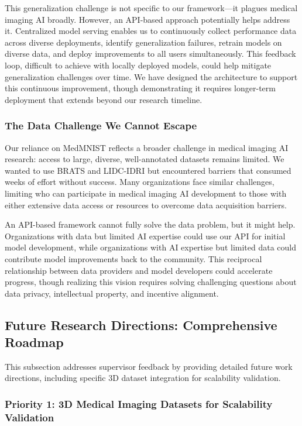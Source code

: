 \documentclass[12pt,a4paper]{article}
\begin{document}
This generalization challenge is not specific to our framework—it plagues medical imaging AI broadly. However, an API-based approach potentially helps address it. Centralized model serving enables us to continuously collect performance data across diverse deployments, identify generalization failures, retrain models on diverse data, and deploy improvements to all users simultaneously. This feedback loop, difficult to achieve with locally deployed models, could help mitigate generalization challenges over time. We have designed the architecture to support this continuous improvement, though demonstrating it requires longer-term deployment that extends beyond our research timeline.

\subsubsection{The Data Challenge We Cannot Escape}

Our reliance on MedMNIST reflects a broader challenge in medical imaging AI research: access to large, diverse, well-annotated datasets remains limited. We wanted to use BRATS and LIDC-IDRI but encountered barriers that consumed weeks of effort without success. Many organizations face similar challenges, limiting who can participate in medical imaging AI development to those with either extensive data access or resources to overcome data acquisition barriers.

An API-based framework cannot fully solve the data problem, but it might help. Organizations with data but limited AI expertise could use our API for initial model development, while organizations with AI expertise but limited data could contribute model improvements back to the community. This reciprocal relationship between data providers and model developers could accelerate progress, though realizing this vision requires solving challenging questions about data privacy, intellectual property, and incentive alignment.

\subsection{Future Research Directions: Comprehensive Roadmap}

This subsection addresses supervisor feedback by providing detailed future work directions, including specific 3D dataset integration for scalability validation.

\subsubsection{Priority 1: 3D Medical Imaging Datasets for Scalability Validation}
\end{document}

